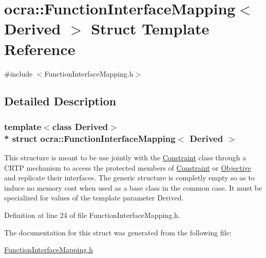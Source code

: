 \hypertarget{structocra_1_1FunctionInterfaceMapping}{}\section{ocra\+:\+:Function\+Interface\+Mapping$<$ Derived $>$ Struct Template Reference}
\label{structocra_1_1FunctionInterfaceMapping}


{\ttfamily \#include $<$Function\+Interface\+Mapping.\+h$>$}



\subsection{Detailed Description}
\subsubsection*{template$<$class Derived$>$\\*
struct ocra\+::\+Function\+Interface\+Mapping$<$ Derived $>$}

This structure is meant to be use jointly with the \hyperlink{classocra_1_1Constraint}{Constraint} class through a C\+R\+TP mechanism to access the protected members of \hyperlink{classocra_1_1Constraint}{Constraint} or \hyperlink{classocra_1_1Objective}{Objective} and replicate their interfaces. The generic structure is completly empty so as to induce no memory cost when used as a base class in the common case. It must be specialized for values of the template parameter Derived. 

Definition at line 24 of file Function\+Interface\+Mapping.\+h.



The documentation for this struct was generated from the following file\+:\begin{DoxyCompactItemize}
\item 
\hyperlink{FunctionInterfaceMapping_8h}{Function\+Interface\+Mapping.\+h}\end{DoxyCompactItemize}
